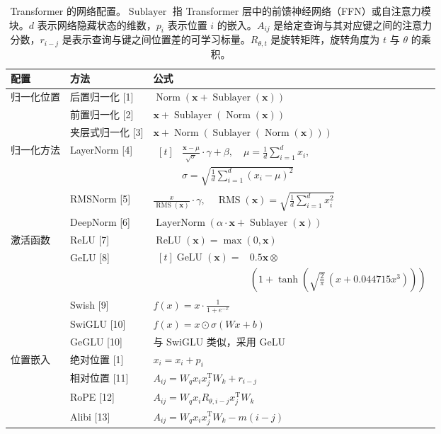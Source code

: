 \begin{table}[!htbp]
\centering
\caption{Transformer 的网络配置。$\operatorname{Sublayer}$ 指 Transformer 层中的前馈神经网络（FFN）或自注意力模块。$d$ 表示网络隐藏状态的维数，$p_i$ 表示位置 $i$ 的嵌入。$A_{ij}$ 是给定查询与其对应键之间的注意力分数，$r_{i-j}$ 是表示查询与键之间位置差的可学习标量。$R_{\theta,t}$ 是旋转矩阵，旋转角度为 $t$ 与 $\theta$ 的乘积。}
\label{tab:ch02-variants}
\footnotesize
\setlength{\tabcolsep}{4pt}
\renewcommand{\arraystretch}{1.23}
\begin{tabularx}{\linewidth}{@{}p{.18\linewidth}p{.21\linewidth}>{\raggedright\arraybackslash}X@{}}
\toprule
配置 & 方法 & 公式\\
\midrule
归一化位置 & 后置归一化 [1] & $\operatorname{Norm}(\symbf{x}+\operatorname{Sublayer}(\symbf{x}))$\\
 & 前置归一化 [2] & $\symbf{x}+\operatorname{Sublayer}(\operatorname{Norm}(\symbf{x}))$\\
 & 夹层式归一化 [3] & $\symbf{x}+\operatorname{Norm}(\operatorname{Sublayer}(\operatorname{Norm}(\symbf{x})))$\\
\midrule
归一化方法 & LayerNorm [4] &
$\begin{aligned}[t]
 & \tfrac{\symbf{x}-\mu}{\sqrt{\sigma}}\cdot\gamma+\beta,\quad
 \mu=\tfrac{1}{d}\sum_{i=1}^{d}x_i,\\
 & \sigma=\sqrt{\tfrac{1}{d}\sum_{i=1}^{d}(x_i-\mu)^2}
\end{aligned}$\\
 & RMSNorm [5] &
$\tfrac{x}{\operatorname{RMS}(\symbf{x})}\cdot\gamma,\quad
 \operatorname{RMS}(\symbf{x})=\sqrt{\tfrac{1}{d}\sum_{i=1}^{d}x_i^2}$\\
 & DeepNorm [6] & $\operatorname{LayerNorm}(\alpha\cdot\symbf{x}+\operatorname{Sublayer}(\symbf{x}))$\\
\midrule
激活函数 & ReLU [7] & $\operatorname{ReLU}(\symbf{x})=\max(0,\symbf{x})$\\
 & GeLU [8] &
$\begin{aligned}[t]
\operatorname{GeLU}(\symbf{x})={}&0.5\symbf{x}\otimes{}\\
 & \left(1+\tanh\left(\sqrt{\tfrac{2}{\pi}}\,(x+0.044715x^3)\right)\right)
\end{aligned}$\\
 & Swish [9] & $f(x)=x\cdot\tfrac{1}{1+e^{-x}}$\\
 & SwiGLU [10] & $f(x)=x\odot\sigma(Wx+b)$\\
 & GeGLU [10] & 与 SwiGLU 类似，采用 GeLU\\
\midrule
位置嵌入 & 绝对位置 [1] & $x_i=x_i+p_i$\\
 & 相对位置 [11] & $A_{ij}=W_qx_ix_j^{\mathrm{T}}W_k+r_{i-j}$\\
 & RoPE [12] & $A_{ij}=W_qx_iR_{\theta,i-j}x_j^{\mathrm{T}}W_k$\\
 & Alibi [13] & $A_{ij}=W_qx_ix_j^{\mathrm{T}}W_k-m(i-j)$\\
\bottomrule
\end{tabularx}


\end{table}
